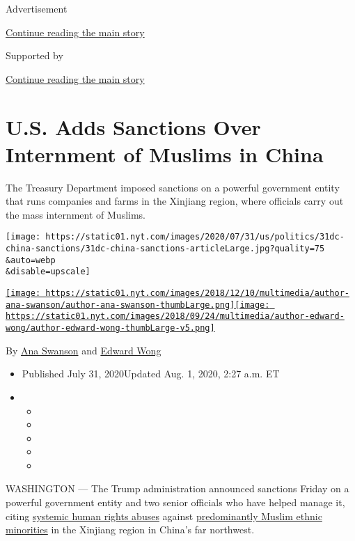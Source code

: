 Advertisement

\protect\hyperlink{after-top}{Continue reading the main story}

Supported by

\protect\hyperlink{after-sponsor}{Continue reading the main story}

\hypertarget{us-adds-sanctions-over-internment-of-muslims-in-china}{%
\section{U.S. Adds Sanctions Over Internment of Muslims in
China}\label{us-adds-sanctions-over-internment-of-muslims-in-china}}

The Treasury Department imposed sanctions on a powerful government
entity that runs companies and farms in the Xinjiang region, where
officials carry out the mass internment of Muslims.

\texttt{[image: https://static01.nyt.com/images/2020/07/31/us/politics/31dc-china-sanctions/31dc-china-sanctions-articleLarge.jpg?quality=75\\\&auto=webp\\\&disable=upscale]}

\href{https://www.nytimes.com/by/ana-swanson}{\texttt{[image: https://static01.nyt.com/images/2018/12/10/multimedia/author-ana-swanson/author-ana-swanson-thumbLarge.png]}}\href{https://www.nytimes.com/by/edward-wong}{\texttt{[image: https://static01.nyt.com/images/2018/09/24/multimedia/author-edward-wong/author-edward-wong-thumbLarge-v5.png]}}

By \href{https://www.nytimes.com/by/ana-swanson}{Ana Swanson} and
\href{https://www.nytimes.com/by/edward-wong}{Edward Wong}

\begin{itemize}
\item
  Published July 31, 2020Updated Aug. 1, 2020, 2:27 a.m. ET
\item
  \begin{itemize}
  \item
  \item
  \item
  \item
  \item
  \end{itemize}
\end{itemize}

WASHINGTON --- The Trump administration announced sanctions Friday on a
powerful government entity and two senior officials who have helped
manage it, citing
\href{https://www.nytimes.com/2020/05/09/us/politics/china-uighurs-arrest.html}{systemic
human rights abuses} against
\href{https://www.nytimes.com/2018/10/18/world/asia/uighur-muslims-china-detainment.html}{predominantly
Muslim ethnic minorities} in the Xinjiang region in China's far
northwest.

